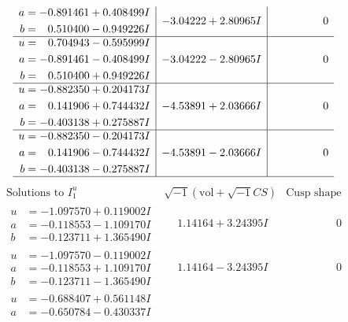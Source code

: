 \documentclass[1p]{elsarticle_modified}
\theoremstyle{definition}
\newcommand{\I}{\sqrt{-1}}
\begin{document}
$$\begin{array}{c|c|c}
\begin{aligned}
a &= -0.891461 + 0.408499 I \\
b &= \phantom{-}0.510400 - 0.949226 I\end{aligned}
 & -3.04222 + 2.80965 I & \phantom{-0.000000 } 0 \\ \hline\begin{aligned}
u &= \phantom{-}0.704943 - 0.595999 I \\
a &= -0.891461 - 0.408499 I \\
b &= \phantom{-}0.510400 + 0.949226 I\end{aligned}
 & -3.04222 - 2.80965 I & \phantom{-0.000000 } 0 \\ \hline\begin{aligned}
u &= -0.882350 + 0.204173 I \\
a &= \phantom{-}0.141906 + 0.744432 I \\
b &= -0.403138 + 0.275887 I\end{aligned}
 & -4.53891 + 2.03666 I & \phantom{-0.000000 } 0 \\ \hline\begin{aligned}
u &= -0.882350 - 0.204173 I \\
a &= \phantom{-}0.141906 - 0.744432 I \\
b &= -0.403138 - 0.275887 I\end{aligned}
 & -4.53891 - 2.03666 I & \phantom{-0.000000 } 0\\
 \hline 
 \end{array}$$\newpage$$\begin{array}{c|c|c}  
\text{Solutions to }I^u_{1}& \I (\text{vol} + \sqrt{-1}CS) & \text{Cusp shape}\\
 \hline 
\begin{aligned}
u &= -1.097570 + 0.119002 I \\
a &= -0.118553 - 1.109170 I \\
b &= -0.123711 + 1.365490 I\end{aligned}
 & \phantom{-}1.14164 + 3.24395 I & \phantom{-0.000000 } 0 \\ \hline\begin{aligned}
u &= -1.097570 - 0.119002 I \\
a &= -0.118553 + 1.109170 I \\
b &= -0.123711 - 1.365490 I\end{aligned}
 & \phantom{-}1.14164 - 3.24395 I & \phantom{-0.000000 } 0 \\ \hline\begin{aligned}
u &= -0.688407 + 0.561148 I \\
a &= -0.650784 - 0.430337 I \\

\end{aligned}
\end{array}$$
\end{document}
